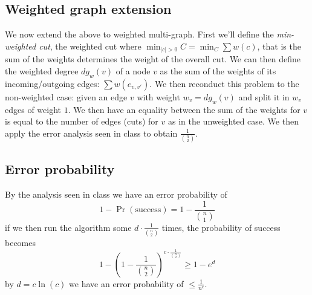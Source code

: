 \subsection{Weighted graph extension}

We now extend the above to weighted multi-graph.
First we'll define the \emph{min-weighted cut}, the weighted cut where
$\min_{|c| > 0} C = \min_{C} \sum{w(c)}$, that is the sum of the
weights determines the weight of the overall cut.
We can then define the weighted degree $dg_{w}(v)$ of a node $v$ as the
sum of the weights of its incoming/outgoing edges: $\sum{w(e_{v, v'})}$.
We then reconduct this problem to the non-weighted case: given an edge $v$ with weight $w_v = dg_{w}(v)$ and split it in $w_v$ edges of weight $1$.
We then have an equality between the sum of the weights for $v$ is equal to the number of edges (cuts) for $v$ as in the unweighted case.
We then apply the error analysis seen in class to obtain $\frac{1}{{{n} \choose {2}}}$.

\subsection{Error probability}

By the analysis seen in class we have an error probability of
\begin{equation*}
1 - \Pr({\text{success}}) = 1 - \frac{1}{{{n} \choose {1}}}
\end{equation*}
if we then run the algorithm some $d \cdot \frac{1}{{{n} \choose {2}}}$ times, the probability of success becomes
\begin{equation*}
1 - \left(1 - \frac{1}{{{n} \choose {2}}} \right)^{c \cdot \frac{1}{{{n} \choose {2}}}} \geq 1 - e^{d}
\end{equation*}
by $d = c \ln(c)$ we have an error probability of $\leq \frac{1}{n^c}$.
